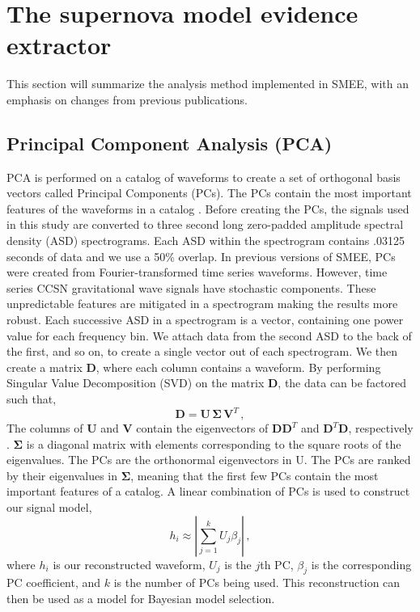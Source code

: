 \documentclass[letterpaper, aps, prd, twocolumn, superscriptaddress, showpacs, nofootinbib]{revtex4}
\begin{document}
\section{The supernova model evidence extractor}
\label{sec:smee}

This section will summarize the analysis method implemented in SMEE, with an emphasis on changes from previous publications. %

\subsection{Principal Component Analysis (PCA)}

PCA is performed on a catalog of waveforms to create a set of orthogonal basis vectors called Principal Components (PCs). The PCs contain the most important features of the waveforms in a catalog \cite{logue:12, powell:16b, 2017PhRvD..96l3013P, heng:09}. Before creating the PCs, the signals used in this study are converted to three second long zero-padded amplitude spectral density (ASD) spectrograms. Each ASD within the spectrogram contains .03125 seconds of data and we use a 50\% overlap. In previous versions of SMEE, PCs were created from Fourier-transformed time series waveforms. However, time series CCSN gravitational wave signals have stochastic components. These unpredictable features are mitigated in a spectrogram making the results more robust. Each successive ASD in a spectrogram is a vector, containing one power value for each frequency bin. We attach data from the second ASD to the back of the first, and so on, to create a single vector out of each spectrogram. We then create a matrix $\textbf{D}$, where each column contains a waveform. By performing Singular Value Decomposition (SVD) on the matrix $\textbf{D}$, the data can be factored such that,
\begin{equation}
\textbf{D} = \textbf{U}\,\boldsymbol\Sigma\,\textbf{V}^{T}\,,
\end{equation}
The columns of $\textbf{U}$ and $\textbf{V}$ contain the eigenvectors of $\textbf{D}\textbf{D}^{T}$ and $\textbf{D}^{T} \textbf{D}$, respectively \cite{heng:09}. $\boldsymbol\Sigma$ is a diagonal matrix with elements corresponding to the square roots of the eigenvalues. The PCs are the orthonormal eigenvectors in U. The PCs are ranked by their eigenvalues in $\boldsymbol\Sigma$, meaning that the first few PCs contain the most important features of a catalog. A linear combination of PCs is used to construct our signal model, 
\begin{equation}
h_i \approx | \sum_{j=1}^{k} U_j \beta_j | \,,
\label{equ:linear_sum}
\end{equation}
where $h_i$ is our reconstructed waveform, $U_j$ is the $j$th PC, $\beta_j$ is the corresponding PC coefficient, and $k$ is the number of PCs being used. This reconstruction can then be used as a model for Bayesian model selection.
\end{document}
